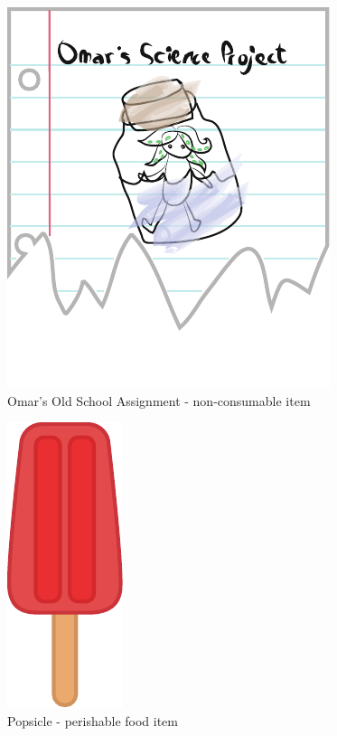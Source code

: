 \begin{figure}[p]
	\centering\includegraphics[height=.8\paperheight]{images/items_note}
	\caption{Omar's Old School Assignment - non-consumable item}
\end{figure}
\begin{figure}[p]
	\centering\includegraphics[height=.8\paperheight]{images/items_popsicle}
	\caption{Popsicle - perishable food item}
\end{figure}
